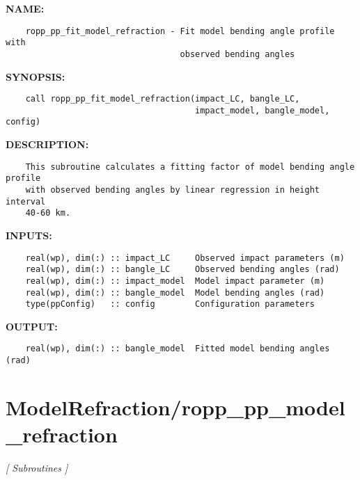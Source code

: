 \label{ch:robo36}
\label{ch:ModelRefraction_ropp_pp_fit_model_refraction}
\textbf{NAME:}\hspace{0.08in}\begin{Verbatim}
    ropp_pp_fit_model_refraction - Fit model bending angle profile with 
                                   observed bending angles
\end{Verbatim}
\textbf{SYNOPSIS:}\hspace{0.08in}\begin{Verbatim}
    call ropp_pp_fit_model_refraction(impact_LC, bangle_LC, 
                                      impact_model, bangle_model, config)
\end{Verbatim}
\textbf{DESCRIPTION:}\hspace{0.08in}\begin{Verbatim}
    This subroutine calculates a fitting factor of model bending angle profile
    with observed bending angles by linear regression in height interval 
    40-60 km.
\end{Verbatim}
\textbf{INPUTS:}\hspace{0.08in}\begin{Verbatim}
    real(wp), dim(:) :: impact_LC     Observed impact parameters (m)   
    real(wp), dim(:) :: bangle_LC     Observed bending angles (rad)
    real(wp), dim(:) :: impact_model  Model impact parameter (m)
    real(wp), dim(:) :: bangle_model  Model bending angles (rad)
    type(ppConfig)   :: config        Configuration parameters
\end{Verbatim}
\textbf{OUTPUT:}\hspace{0.08in}\begin{Verbatim}
    real(wp), dim(:) :: bangle_model  Fitted model bending angles (rad)
\end{Verbatim}
\section{ModelRefraction/ropp\_pp\_model\_refraction}
\textsl{[ Subroutines ]}

